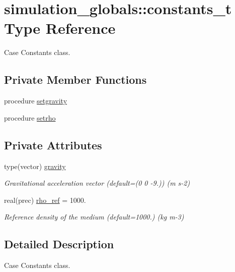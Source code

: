 \hypertarget{structsimulation__globals_1_1constants__t}{}\section{simulation\+\_\+globals\+:\+:constants\+\_\+t Type Reference}
\label{structsimulation__globals_1_1constants__t}


Case Constants class.  


\subsection*{Private Member Functions}
\begin{DoxyCompactItemize}
\item 
procedure \mbox{\hyperlink{structsimulation__globals_1_1constants__t_a5037e6304087d5731de4aa741ea25a62}{setgravity}}
\item 
procedure \mbox{\hyperlink{structsimulation__globals_1_1constants__t_a67ddcf6c24df193c78cfd51574b49e4d}{setrho}}
\end{DoxyCompactItemize}
\subsection*{Private Attributes}
\begin{DoxyCompactItemize}
\item 
type(vector) \mbox{\hyperlink{structsimulation__globals_1_1constants__t_a4eec4dda6ff156f096dbfbaac5ea2a6b}{gravity}}
\begin{DoxyCompactList}\small\item\em Gravitational acceleration vector (default=(0 0 -\/9.)) (m s-\/2) \end{DoxyCompactList}\item 
real(prec) \mbox{\hyperlink{structsimulation__globals_1_1constants__t_af9496305e46cea74e54758362274a701}{rho\+\_\+ref}} = 1000.
\begin{DoxyCompactList}\small\item\em Reference density of the medium (default=1000.) (kg m-\/3) \end{DoxyCompactList}\end{DoxyCompactItemize}


\subsection{Detailed Description}
Case Constants class. 

